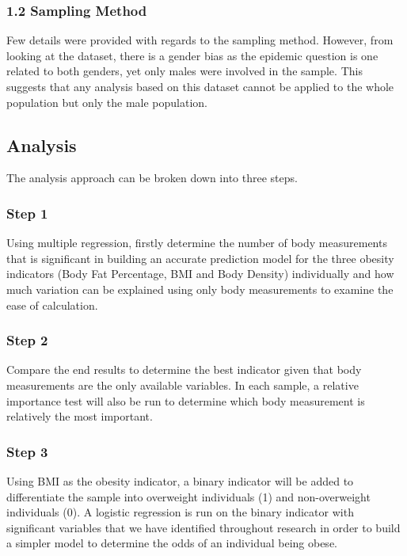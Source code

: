 \documentclass[a4paper,9pt,twocolumn,twoside,]{pinp}
\begin{document}
\hypertarget{sampling-method}{%
\subsubsection{1.2 Sampling Method}\label{sampling-method}}

Few details were provided with regards to the sampling method. However,
from looking at the dataset, there is a gender bias as the epidemic
question is one related to both genders, yet only males were involved in
the sample. This suggests that any analysis based on this dataset cannot
be applied to the whole population but only the male population.

\hypertarget{analysis}{%
\subsection{Analysis}\label{analysis}}

The analysis approach can be broken down into three steps.

\hypertarget{step-1}{%
\subsubsection{Step 1}\label{step-1}}

Using multiple regression, firstly determine the number of body
measurements that is significant in building an accurate prediction
model for the three obesity indicators (Body Fat Percentage, BMI and
Body Density) individually and how much variation can be explained using
only body measurements to examine the ease of calculation.

\hypertarget{step-2}{%
\subsubsection{Step 2}\label{step-2}}

Compare the end results to determine the best indicator given that body
measurements are the only available variables. In each sample, a
relative importance test will also be run to determine which body
measurement is relatively the most important.

\hypertarget{step-3}{%
\subsubsection{Step 3}\label{step-3}}

Using BMI as the obesity indicator, a binary indicator will be added to
differentiate the sample into overweight individuals (1) and
non-overweight individuals (0). A logistic regression is run on the
binary indicator with significant variables that we have identified
throughout research in order to build a simpler model to determine the
odds of an individual being obese.
\end{document}
